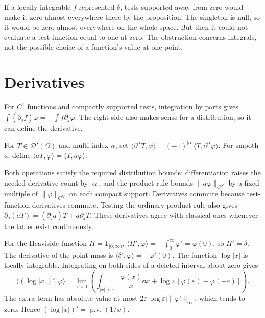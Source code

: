 \begin{think}
If a locally integrable $f$ represented $\delta$, tests supported away from zero would make it zero almost everywhere there by the proposition. The singleton is null, so it would be zero almost everywhere on the whole space. But then it could not evaluate a test function equal to one at zero. The obstruction concerns integrals, not the possible choice of a function's value at one point.
\end{think}

\section{Derivatives}

For $C^1$ functions and compactly supported tests, integration by parts gives $\int(\partial_jf)\varphi=-\int f\partial_j\varphi$. The right side also makes sense for a distribution, so it can define the derivative.

\begin{definition}
For $T\in\mathcal D'(\Omega)$ and multi-index $\alpha$, set
$\langle\partial^\alpha T,\varphi\rangle=(-1)^{|\alpha|}\langle T,\partial^\alpha\varphi\rangle$.
For smooth $a$, define $\langle aT,\varphi\rangle=\langle T,a\varphi\rangle$.
\end{definition}

Both operations satisfy the required distribution bounds: differentiation raises the needed derivative count by $|\alpha|$, and the product rule bounds $\|a\varphi\|_{C^N}$ by a fixed multiple of $\|\varphi\|_{C^N}$ on each compact support. Derivatives commute because test-function derivatives commute. Testing the ordinary product rule also gives $\partial_j(aT)=(\partial_ja)T+a\partial_jT$. These derivatives agree with classical ones whenever the latter exist continuously.

\begin{example}\label{ex:derivatives}
For the Heaviside function $H=\mathbf1_{[0,\infty)}$,
$\langle H',\varphi\rangle=-\int_0^\infty\varphi'=\varphi(0)$,
so $H'=\delta$. The derivative of the point mass is $\langle\delta',\varphi\rangle=-\varphi'(0)$.
The function $\log|x|$ is locally integrable. Integrating on both sides of a deleted interval about zero gives
\[
\langle(\log|x|)',\varphi\rangle
=\lim_{\varepsilon\downarrow0}\left(
\int_{|x|>\varepsilon}\frac{\varphi(x)}x\dd x
+\log\varepsilon\,[\varphi(\varepsilon)-\varphi(-\varepsilon)]\right).
\]
The extra term has absolute value at most $2\varepsilon|\log\varepsilon|\|\varphi'\|_\infty$, which tends to zero. Hence $(\log|x|)'=\operatorname{p.v.}(1/x)$.
\end{example}

